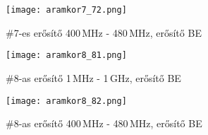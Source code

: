 \begin{figure}[!ht]
	\centering
	\texttt{[image: aramkor7\_72.png]}
	\caption{\#7-es erősítő 400\,MHz - 480\,MHz, erősítő BE}
	\label{fig:meres72}
\end{figure}



\begin{figure}[!ht]
	\centering
	\texttt{[image: aramkor8\_81.png]}
	\caption{\#8-as erősítő 1\,MHz - 1\,GHz, erősítő BE}
	\label{fig:meres81}
\end{figure}

\begin{figure}[!ht]
	\centering
	\texttt{[image: aramkor8\_82.png]}
	\caption{\#8-as erősítő 400\,MHz - 480\,MHz, erősítő BE}
	\label{fig:meres82}
\end{figure}
\newpage
